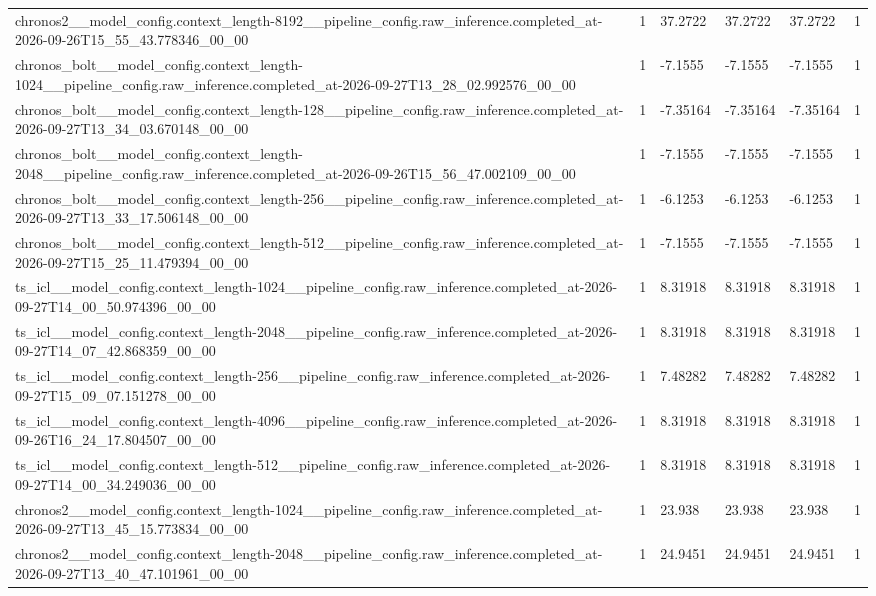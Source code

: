 \begin{tabular}{llllll}
chronos2\_\_model\_config.context\_length-8192\_\_pipeline\_config.raw\_inference.completed\_at-2026-09-26T15\_55\_43.778346\_00\_00 & 1 & 37.2722 & 37.2722 & 37.2722 & 1 \\
chronos\_bolt\_\_model\_config.context\_length-1024\_\_pipeline\_config.raw\_inference.completed\_at-2026-09-27T13\_28\_02.992576\_00\_00 & 1 & -7.1555 & -7.1555 & -7.1555 & 1 \\
chronos\_bolt\_\_model\_config.context\_length-128\_\_pipeline\_config.raw\_inference.completed\_at-2026-09-27T13\_34\_03.670148\_00\_00 & 1 & -7.35164 & -7.35164 & -7.35164 & 1 \\
chronos\_bolt\_\_model\_config.context\_length-2048\_\_pipeline\_config.raw\_inference.completed\_at-2026-09-26T15\_56\_47.002109\_00\_00 & 1 & -7.1555 & -7.1555 & -7.1555 & 1 \\
chronos\_bolt\_\_model\_config.context\_length-256\_\_pipeline\_config.raw\_inference.completed\_at-2026-09-27T13\_33\_17.506148\_00\_00 & 1 & -6.1253 & -6.1253 & -6.1253 & 1 \\
chronos\_bolt\_\_model\_config.context\_length-512\_\_pipeline\_config.raw\_inference.completed\_at-2026-09-27T15\_25\_11.479394\_00\_00 & 1 & -7.1555 & -7.1555 & -7.1555 & 1 \\
ts\_icl\_\_model\_config.context\_length-1024\_\_pipeline\_config.raw\_inference.completed\_at-2026-09-27T14\_00\_50.974396\_00\_00 & 1 & 8.31918 & 8.31918 & 8.31918 & 1 \\
ts\_icl\_\_model\_config.context\_length-2048\_\_pipeline\_config.raw\_inference.completed\_at-2026-09-27T14\_07\_42.868359\_00\_00 & 1 & 8.31918 & 8.31918 & 8.31918 & 1 \\
ts\_icl\_\_model\_config.context\_length-256\_\_pipeline\_config.raw\_inference.completed\_at-2026-09-27T15\_09\_07.151278\_00\_00 & 1 & 7.48282 & 7.48282 & 7.48282 & 1 \\
ts\_icl\_\_model\_config.context\_length-4096\_\_pipeline\_config.raw\_inference.completed\_at-2026-09-26T16\_24\_17.804507\_00\_00 & 1 & 8.31918 & 8.31918 & 8.31918 & 1 \\
ts\_icl\_\_model\_config.context\_length-512\_\_pipeline\_config.raw\_inference.completed\_at-2026-09-27T14\_00\_34.249036\_00\_00 & 1 & 8.31918 & 8.31918 & 8.31918 & 1 \\
chronos2\_\_model\_config.context\_length-1024\_\_pipeline\_config.raw\_inference.completed\_at-2026-09-27T13\_45\_15.773834\_00\_00 & 1 & 23.938 & 23.938 & 23.938 & 1 \\
chronos2\_\_model\_config.context\_length-2048\_\_pipeline\_config.raw\_inference.completed\_at-2026-09-27T13\_40\_47.101961\_00\_00 & 1 & 24.9451 & 24.9451 & 24.9451 & 1 \\

\end{tabular}

